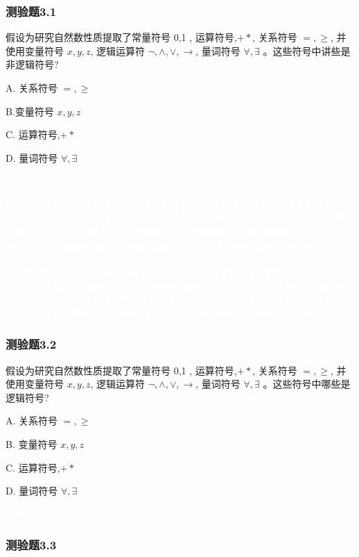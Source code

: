 \documentclass[UTF8, heading=true]{ctexart}
\begin{document}
\subsubsection{测验题3.1}

假设为研究自然数性质提取了常量符号 0,1 , 运算符号,$+ *$, 关系符号 $=, \geq$, 并使用变量符号 $x, y, z$, 逻辑运算符 $\neg, \wedge, \vee, \rightarrow$, 量词符号 $\forall, \exists$ 。这些符号中讲些是非逻辑符号?

A. 关系符号 $=, \geq$

B.变量符号 $x, y, z$

C. 运算符号,$+ *$

D. 量词符号 $\forall, \exists$

\textcolor{white}{答案：AC}

\textcolor{white}{解析：一阶逻辑公式中出现的逻辑符号包括: (1) 个体变量符号, 使用小写字母 $x, y, z, \cdots$ 等表示个体变量, 记所有个体变量符号构成的集合为$V$；
（2）逻辑运算符号,包括否定 $\neg$ 逻辑与 $\wedge$ 、
逻辑或 $\vee$ 、逻辑蕴涵 $\rightarrow$ 和逻辑双蕴涵 
$\leftrightarrow ;(3)$ 量词符号：包括全称量词 $\forall$ 
和存在量词 $\exists ;(4)$ 辅助符号,包括圆括号(和), 以及逗号。
\\ \indent 一阶逻辑公式中出现的非逻辑符号包括：（1）个体常量符号,
使用小写字母 $a, b, c, \cdots$ 等表示个体常量；（2）函数符号,
使用小写字母 $f, g, h, \cdots$ 等表示函数,每个函数都有一个元数信息,
表明该函数是几元函数；（3）谓词符号,使用大写字母 $F, G, H, \cdots$ 表示谓词,
每个谓词都有一个元数信息,表明该谓词是几元谓词。}

\subsubsection{测验题3.2}

假设为研究自然数性质提取了常量符号 0,1 , 运算符号,$+ *$, 关系符号 $=, \geq$, 并使用变量符号 $x, y, z$, 逻辑运算符 $\neg, \wedge, \vee, \rightarrow$, 量词符号 $\forall, \exists$ 。这些符号中哪些是逻辑符号?

A. 关系符号 $=, \geq$

B. 变量符号 $x, y, z$

C. 运算符号,$+ *$

D. 量词符号 $\forall, \exists$

\textcolor{white}{答案：BD}


\subsubsection{测验题3.3}
\end{document}

